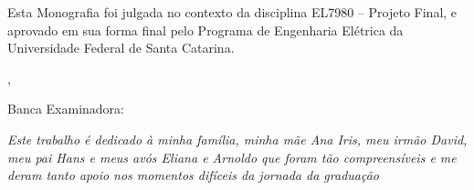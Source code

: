 \documentclass[a5paper]{ufsc-thesis}
\begin{document}
\begin{folhadeaprovacao}

  \begin{center}
    {\imprimirautor}

    \vspace*{\fill}\vspace*{\fill}
    \begin{center}
      \ABNTEXchapterfont\bfseries\Large\imprimirtitulo
    \end{center}
    \vspace*{\fill}
    
    
    	\begin{center}
    		\vspace*{0.5cm}
    		Esta Monografia foi julgada no contexto da disciplina EL7980 -- Projeto Final, e aprovado em sua forma final pelo Programa de Engenharia Elétrica da Universidade Federal de Santa Catarina.
    		\vspace*{0.5cm}
  		\end{center}
    
    \vspace*{\fill}
   \end{center}
  
  \begin{center}
    {\large\imprimirlocal},
    {\large\imprimirdata}
  \end{center}
        
   Banca Examinadora:
      

\end{folhadeaprovacao}

\begin{dedicatoria}
   \vspace*{\fill}
   \centering
   \noindent
   \textit{Este trabalho é dedicado à minha família, minha mãe Ana Iris, meu irmão David, meu pai Hans e meus avós Eliana e Arnoldo que foram tão compreensíveis e me deram tanto apoio nos momentos difíceis da jornada da graduação} \vspace*{\fill}
\end{dedicatoria}
\end{document}
